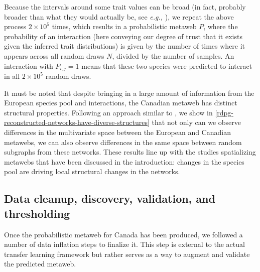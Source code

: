 \begin{refsection}
Because the intervals around some trait values can be broad (in fact,
probably broader than what they would actually be, see \emph{e.g.,}
\cite{Garland1999Introduction}), we repeat the above process \(2\times 10^5\)
times, which results in a probabilistic metaweb \(P\), where the
probability of an interaction (here conveying our degree of trust that
it exists given the inferred trait distributions) is given by the number
of times where it appears across all random draws \(N\), divided by the
number of samples. An interaction with \(P_{i,j} = 1\) means that these
two species were predicted to interact in all \(2\times 10^5\) random
draws.

It must be noted that despite bringing in a large amount of information
from the European species pool and interactions, the Canadian metaweb
has distinct structural properties. Following an approach similar to
\cite{Vermaat2009Major}, we show in \autoref{rdpg-reconstructed-networks-have-diverse-structures} that not only can we observe
differences in the multivariate space between the European and Canadian
metawebs, we can also observe differences in the same space between
random subgraphs from these networks. These results line up with the
studies spatializing metawebs that have been discussed in the
introduction: changes in the species pool are driving local structural
changes in the networks.

\subsection{Data cleanup, discovery, validation, and
thresholding}\label{data-cleanup-discovery-validation-and-thresholding}

Once the probabilistic metaweb for Canada has been produced, we followed
a number of data inflation steps to finalize it. This step is external
to the actual transfer learning framework but rather serves as a way to
augment and validate the predicted metaweb.


\end{refsection}
